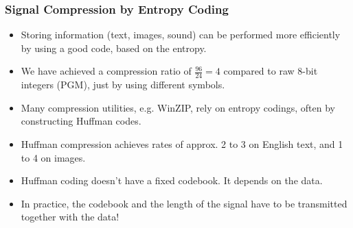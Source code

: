 \documentclass{beamer}
\begin{document}
\begin{frame}
\frametitle{Signal Compression by Entropy Coding} 
\begin{itemize}
\item Storing information (text, images, sound) can be performed more 
efficiently by using a good code, based on the entropy.
\item We have achieved a compression ratio of $\frac{96}{24} = 4$ compared to 
raw 8-bit integers (PGM), just by using different symbols. 
\item Many compression utilities, e.g. WinZIP, rely on entropy codings, often by 
constructing Huffman codes.
\item Huffman compression achieves rates of approx. 2 to 3 on English text, 
and 1 to 4 on images. 
\item Huffman coding doesn't have a fixed codebook. It depends on the data.
\item In practice, the codebook and the length of the signal have to be transmitted together with the data!

%
%
\end{itemize}
\end{frame}
\end{document}
